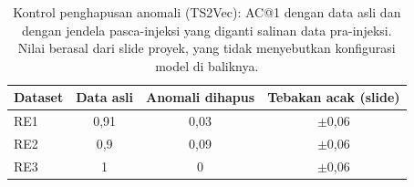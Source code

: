 \begin{table}
\caption{Kontrol penghapusan anomali (TS2Vec): AC@1 dengan data asli dan dengan jendela pasca-injeksi yang diganti salinan data pra-injeksi. Nilai berasal dari slide proyek, yang tidak menyebutkan konfigurasi model di baliknya.}\label{tab:anomaly}
\centering
\small
\begin{tabular}{lccc}
\toprule
Dataset & Data asli & Anomali dihapus & Tebakan acak (slide)\\
\midrule
RE1 & 0,91 & 0,03 & $\pm$0,06\\
RE2 & 0,9  & 0,09 & $\pm$0,06\\
RE3 & 1    & 0    & $\pm$0,06\\
\bottomrule
\end{tabular}
\end{table}
